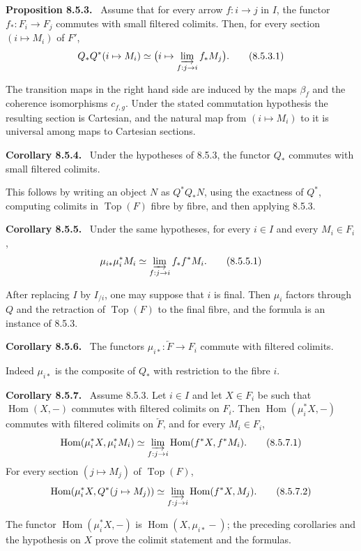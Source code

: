 \documentclass[11pt]{article}
\newcommand{\Top}{\operatorname{Top}}
\newcommand{\Hom}{\operatorname{Hom}}
\newenvironment{statement}[1]{\par\medskip\noindent\textbf{#1.}\ }{\par\medskip}
\begin{document}
\begin{statement}{Proposition 8.5.3}
Assume that for every arrow \(f:i\to j\) in \(I\), the functor \(f_*:F_i\to F_j\) commutes with small filtered colimits. Then, for every section \((i\mapsto M_i)\) of \(F'\),
\[
 Q_*Q^*(i\mapsto M_i)
 \simeq
 \bigl(i\mapsto\varinjlim_{f:j\to i} f_*M_j\bigr). \tag{8.5.3.1}
\]
\end{statement}
The transition maps in the right hand side are induced by the maps \(\beta_f\) and the coherence isomorphisms \(c_{f,g}\). Under the stated commutation hypothesis the resulting section is Cartesian, and the natural map from \((i\mapsto M_i)\) to it is universal among maps to Cartesian sections.

\begin{statement}{Corollary 8.5.4}
Under the hypotheses of 8.5.3, the functor \(Q_*\) commutes with small filtered colimits.
\end{statement}
This follows by writing an object \(N\) as \(Q^*Q_*N\), using the exactness of \(Q^*\), computing colimits in \(\Top(F)\) fibre by fibre, and then applying 8.5.3.

\begin{statement}{Corollary 8.5.5}
Under the same hypotheses, for every \(i\in I\) and every \(M_i\in F_i\),
\[
 \mu_{i*}\mu_i^*M_i\simeq\varinjlim_{f:j\to i}f_*f^*M_i. \tag{8.5.5.1}
\]
\end{statement}
After replacing \(I\) by \(I_{/i}\), one may suppose that \(i\) is final. Then \(\mu_i\) factors through \(Q\) and the retraction of \(\Top(F)\) to the final fibre, and the formula is an instance of 8.5.3.

\begin{statement}{Corollary 8.5.6}
The functors \(\mu_{i*}:\overleftarrow F\to F_i\) commute with filtered colimits.
\end{statement}
Indeed \(\mu_{i*}\) is the composite of \(Q_*\) with restriction to the fibre \(i\).

\begin{statement}{Corollary 8.5.7}
Assume 8.5.3. Let \(i\in I\) and let \(X\in F_i\) be such that \(\Hom(X,-)\) commutes with filtered colimits on \(F_i\). Then \(\Hom(\mu_i^*X,-)\) commutes with filtered colimits on \(\overleftarrow F\), and for every \(M_i\in F_i\),
\[
 \Hom(\mu_i^*X,\mu_i^*M_i)
 \simeq
 \varinjlim_{f:j\to i}\Hom(f^*X,f^*M_i). \tag{8.5.7.1}
\]
For every section \((j\mapsto M_j)\) of \(\Top(F)\),
\[
 \Hom(\mu_i^*X,Q^*(j\mapsto M_j))
 \simeq
 \varinjlim_{f:j\to i}\Hom(f^*X,M_j). \tag{8.5.7.2}
\]
\end{statement}
The functor \(\Hom(\mu_i^*X,-)\) is \(\Hom(X,\mu_{i*}-)\); the preceding corollaries and the hypothesis on \(X\) prove the colimit statement and the formulas.
\end{document}
